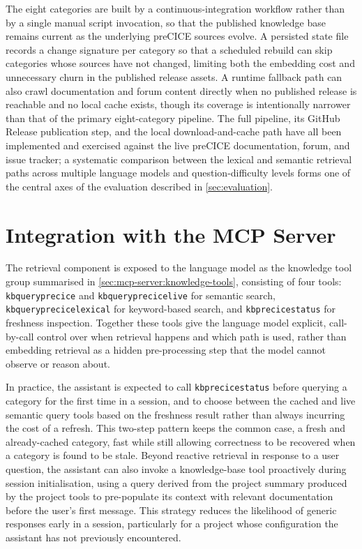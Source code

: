 \documentclass[
  numbers=noenddot,
  english,
  a4paper,
  twoside,
  bibliography=totoc,
  headsepline,
  cleardoublepage=empty,
  parskip=half,
  draft=false
]{scrbook}
\theoremstyle{break}
\renewcommand{\_}{\textunderscore\allowbreak}
\begin{document}
The eight categories are built by a continuous-integration workflow rather than by a single
manual script invocation, so that the published knowledge base remains current as the
underlying preCICE sources evolve. A persisted state file records a change signature per
category so that a scheduled rebuild can skip categories whose sources have not changed,
limiting both the embedding cost and unnecessary churn in the published release assets. A
runtime fallback path can also crawl documentation and forum content directly when no
published release is reachable and no local cache exists, though its coverage is intentionally
narrower than that of the primary eight-category pipeline. The full pipeline, its GitHub
Release publication step, and the local download-and-cache path have all been implemented and
exercised against the live preCICE documentation, forum, and issue tracker; a systematic
comparison between the lexical and semantic retrieval paths across multiple language models
and question-difficulty levels forms one of the central axes of the evaluation described in
\cref{sec:evaluation}.


\section{Integration with the MCP Server}\label{sec:context-retrieval:integration}

The retrieval component is exposed to the language model as the knowledge tool group
summarised in \cref{sec:mcp-server:knowledge-tools}, consisting of four tools:
\texttt{kb\_query\_precice} and \texttt{kb\_query\_precice\_live} for semantic search,
\texttt{kb\_query\_precice\_lexical} for keyword-based search, and
\texttt{kb\_precice\_status} for freshness inspection. Together these tools give the language
model explicit, call-by-call control over when retrieval happens and which path is used,
rather than embedding retrieval as a hidden pre-processing step that the model cannot observe
or reason about.

In practice, the assistant is expected to call \texttt{kb\_precice\_status} before querying a
category for the first time in a session, and to choose between the cached and live semantic
query tools based on the freshness result rather than always incurring the cost of a refresh.
This two-step pattern keeps the common case, a fresh and already-cached category, fast while
still allowing correctness to be recovered when a category is found to be stale. Beyond
reactive retrieval in response to a user question, the assistant can also invoke a
knowledge-base tool proactively during session initialisation, using a query derived from the
project summary produced by the project tools to pre-populate its context with relevant
documentation before the user's first message. This strategy reduces the likelihood of
generic responses early in a session, particularly for a project whose configuration the
assistant has not previously encountered.
\end{document}
